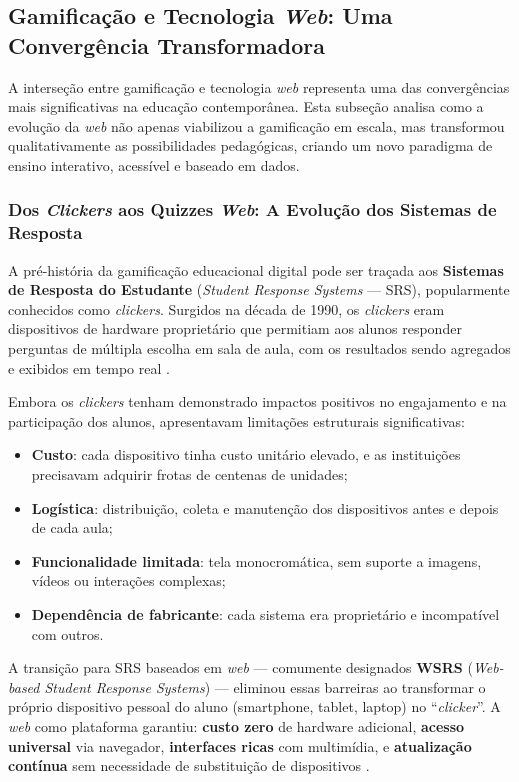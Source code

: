 \documentclass[
	12pt,
	openany,
	oneside,
	a4paper,
	english,
	brazil
]{abntex2}
\begin{document}
\subsection{Gamificação e Tecnologia \textit{Web}: Uma Convergência Transformadora}

A interseção entre gamificação e tecnologia \textit{web} representa uma das convergências mais significativas na educação contemporânea. Esta subseção analisa como a evolução da \textit{web} não apenas viabilizou a gamificação em escala, mas transformou qualitativamente as possibilidades pedagógicas, criando um novo paradigma de ensino interativo, acessível e baseado em dados.

\subsubsection{Dos \textit{Clickers} aos Quizzes \textit{Web}: A Evolução dos Sistemas de Resposta}

A pré-história da gamificação educacional digital pode ser traçada aos \textbf{Sistemas de Resposta do Estudante} (\textit{Student Response Systems} --- SRS), popularmente conhecidos como \textit{clickers}. Surgidos na década de 1990, os \textit{clickers} eram dispositivos de hardware proprietário que permitiam aos alunos responder perguntas de múltipla escolha em sala de aula, com os resultados sendo agregados e exibidos em tempo real \cite{caldwell2007}.

Embora os \textit{clickers} tenham demonstrado impactos positivos no engajamento e na participação dos alunos, apresentavam limitações estruturais significativas:

\begin{itemize}
  \item \textbf{Custo}: cada dispositivo tinha custo unitário elevado, e as instituições precisavam adquirir frotas de centenas de unidades;
  \item \textbf{Logística}: distribuição, coleta e manutenção dos dispositivos antes e depois de cada aula;
  \item \textbf{Funcionalidade limitada}: tela monocromática, sem suporte a imagens, vídeos ou interações complexas;
  \item \textbf{Dependência de fabricante}: cada sistema era proprietário e incompatível com outros.
\end{itemize}

A transição para SRS baseados em \textit{web} --- comumente designados \textbf{WSRS} (\textit{Web-based Student Response Systems}) --- eliminou essas barreiras ao transformar o próprio dispositivo pessoal do aluno (smartphone, tablet, laptop) no ``\textit{clicker}''. A \textit{web} como plataforma garantiu: \textbf{custo zero} de hardware adicional, \textbf{acesso universal} via navegador, \textbf{interfaces ricas} com multimídia, e \textbf{atualização contínua} sem necessidade de substituição de dispositivos \cite{wang2015}.
\end{document}
